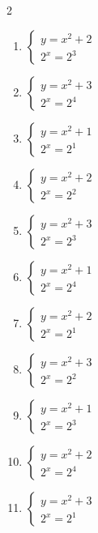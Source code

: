 \documentclass[12pt,a4paper]{article}
\begin{document}
\begin{multicols}{2}
\begin{enumerate}[leftmargin=*, itemsep=6pt]
\item \(\begin{cases} y=x^2+2\\ 2^x=2^{3}\end{cases}\)

\item \(\begin{cases} y=x^2+3\\ 2^x=2^{4}\end{cases}\)

\item \(\begin{cases} y=x^2+1\\ 2^x=2^{1}\end{cases}\)

\item \(\begin{cases} y=x^2+2\\ 2^x=2^{2}\end{cases}\)

\item \(\begin{cases} y=x^2+3\\ 2^x=2^{3}\end{cases}\)

\item \(\begin{cases} y=x^2+1\\ 2^x=2^{4}\end{cases}\)

\item \(\begin{cases} y=x^2+2\\ 2^x=2^{1}\end{cases}\)

\item \(\begin{cases} y=x^2+3\\ 2^x=2^{2}\end{cases}\)

\item \(\begin{cases} y=x^2+1\\ 2^x=2^{3}\end{cases}\)

\item \(\begin{cases} y=x^2+2\\ 2^x=2^{4}\end{cases}\)

\item \(\begin{cases} y=x^2+3\\ 2^x=2^{1}\end{cases}\)

\end{enumerate}
\end{multicols}
\newpage
\end{document}
